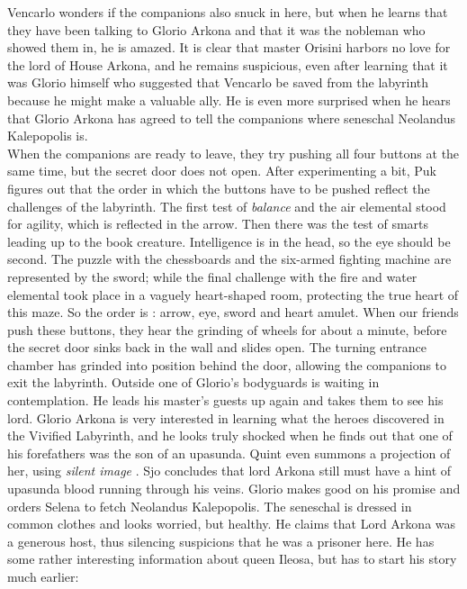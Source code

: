Vencarlo wonders if the companions also snuck in here, but when he learns that they have been talking to Glorio Arkona and that it was the nobleman who showed them in, he is amazed. It is clear that master Orisini harbors no love for the lord of House Arkona, and he remains suspicious, even after learning that it was Glorio himself who suggested that Vencarlo be saved from the labyrinth because he might make a valuable ally. He is even more surprised when he hears that Glorio Arkona has agreed to tell the companions where seneschal Neolandus Kalepopolis is.\\

When the companions are ready to leave, they try pushing all four buttons at the same time, but the secret door does not open. After experimenting a bit, Puk figures out that the order in which the buttons have to be pushed reflect the challenges of the labyrinth. The first test of {\itshape balance} and the air elemental stood for agility, which is reflected in the arrow. Then there was the test of smarts leading up to the book creature. Intelligence is in the head, so the eye should be second. The puzzle with the chessboards and the six-armed fighting machine are represented by the sword; while the final challenge with the fire and water elemental took place in a vaguely heart-shaped room, protecting the true heart of this maze. So the order is : arrow, eye, sword and heart amulet. When our friends push these buttons, they hear the grinding of wheels for about a minute, before the secret door sinks back in the wall and slides open. The turning entrance chamber has grinded into position behind the door, allowing the companions to exit the labyrinth. Outside one of Glorio's bodyguards is waiting in contemplation. He leads his master's guests up again and takes them to see his lord. Glorio Arkona is very interested in learning what the heroes discovered in the Vivified Labyrinth, and he looks truly shocked when he finds out that one of his forefathers was the son of an upasunda. Quint even summons a projection of her, using {\itshape silent image} . Sjo concludes that lord Arkona still must have a hint of upasunda blood running through his veins. Glorio makes good on his promise and orders Selena to fetch Neolandus Kalepopolis. The seneschal is dressed in common clothes and looks worried, but healthy. He claims that Lord Arkona was a generous host, thus silencing suspicions that he was a prisoner here. He has some rather interesting information about queen Ileosa, but has to start his story much earlier:\\

